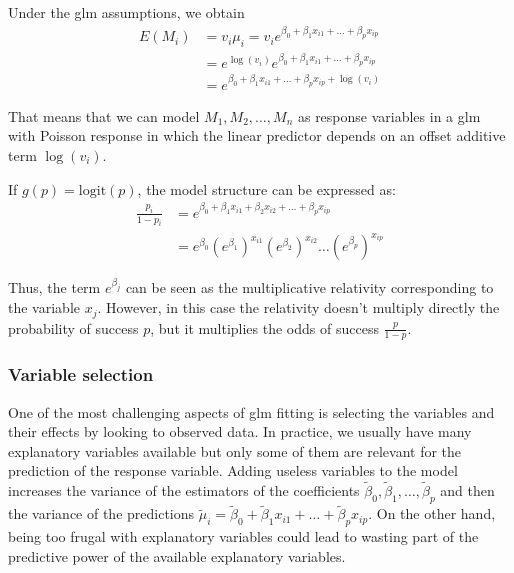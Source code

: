 \documentclass[a4paper, twoside, openright, 12pt]{report}
\theoremstyle{definition}
\theoremstyle{definition}
\theoremstyle{definition}
\theoremstyle{remark}
\begin{document}
Under the \ac{glm} assumptions, we obtain
\begin{align*}
E(M_i) & = v_i \mu_i = v_i e^{\beta_0 + \beta_1 x_{i1} + \dots + \beta_p x_{ip}} \\
& = e^{\log(v_i)}e^{\beta_0 + \beta_1 x_{i1} + \dots + \beta_p x_{ip}} \\
& = e^{\beta_0 + \beta_1 x_{i1} + \dots + \beta_p x_{ip} + \log(v_i)}
\end{align*}

That means that we can model \(M_1, M_2, \dots, M_n\) as response variables in a \ac{glm} with Poisson response in which the linear predictor depends on an offset additive term \(\log(v_i)\).

If \(g(p) = \text{logit}(p)\), the model structure can be expressed as:
\begin{align*}
\frac{p_i}{1-p_i} & = e^{\beta_0 + \beta_1 x_{i1} + \beta_2 x_{i2} + \dots + \beta_p x_{ip}} \\
& = e^{\beta_0} \left(e^{\beta_1}\right)^{x_{i1}} \left(e^{\beta_2}\right)^{x_{i2}} \dots \left(e^{\beta_p}\right)^{x_{ip}}
\end{align*}

Thus, the term \(e^{\beta_j}\) can be seen as the multiplicative relativity corresponding to the variable \(x_j\). However, in this case the relativity doesn't multiply directly the probability of success \(p\), but it multiplies the odds of success \(\frac{p}{1-p}\).

\hypertarget{chap:variable-selection}{%
\subsubsection{Variable selection}\label{chap:variable-selection}}

One of the most challenging aspects of \ac{glm} fitting is selecting the variables and their effects by looking to observed data. In practice, we usually have many explanatory variables available but only some of them are relevant for the prediction of the response variable. Adding useless variables to the model increases the variance of the estimators of the coefficients \(\tilde{\beta}_0, \tilde{\beta}_1, \dots, \tilde{\beta}_p\) and then the variance of the predictions \(\tilde{\mu}_i = \tilde{\beta}_0 + \tilde{\beta}_1 x_{i1} + \dots + \tilde{\beta}_p x_{ip}\). On the other hand, being too frugal with explanatory variables could lead to wasting part of the predictive power of the available explanatory variables.
\end{document}

